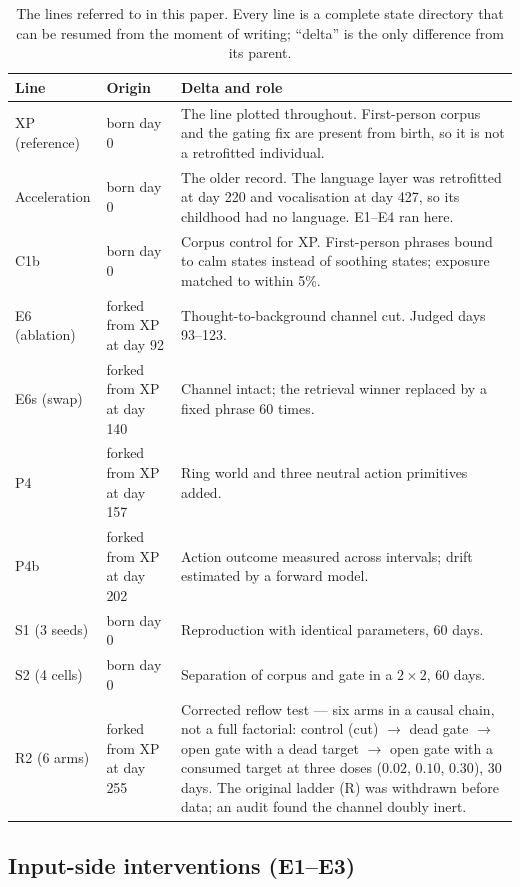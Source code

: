 \documentclass[11pt]{article}
\begin{document}
\begin{table}[h]
\centering
\small
\caption{The lines referred to in this paper. Every line is a complete state directory that can be resumed from the moment of writing; ``delta'' is the only difference from its parent.}
\label{tab:lines}
\begin{tabular}{@{}lL{3.6cm}L{8.0cm}@{}}
\toprule
Line & Origin & Delta and role \\
\midrule
XP (reference) & born day 0 & The line plotted throughout. First-person corpus and the gating fix are present from birth, so it is not a retrofitted individual. \\
Acceleration & born day 0 & The older record. The language layer was retrofitted at day 220 and vocalisation at day 427, so its childhood had no language. E1--E4 ran here. \\
C1b & born day 0 & Corpus control for XP. First-person phrases bound to calm states instead of soothing states; exposure matched to within 5\%. \\
E6 (ablation) & forked from XP at day 92 & Thought-to-background channel cut. Judged days 93--123. \\
E6s (swap) & forked from XP at day 140 & Channel intact; the retrieval winner replaced by a fixed phrase 60 times. \\
P4 & forked from XP at day 157 & Ring world and three neutral action primitives added. \\
P4b & forked from XP at day 202 & Action outcome measured across intervals; drift estimated by a forward model. \\
S1 (3 seeds) & born day 0 & Reproduction with identical parameters, 60 days. \\
S2 (4 cells) & born day 0 & Separation of corpus and gate in a $2\times2$, 60 days. \\
R2 (6 arms) & forked from XP at day 255 & Corrected reflow test --- six arms in a causal chain, not a full factorial: control (cut) $\rightarrow$ dead gate $\rightarrow$ open gate with a dead target $\rightarrow$ open gate with a consumed target at three doses ($0.02$, $0.10$, $0.30$), 30 days. The original ladder (R) was withdrawn before data; an audit found the channel doubly inert. \\
\bottomrule
\end{tabular}
\end{table}

\subsection{Input-side interventions (E1--E3)}
\end{document}
